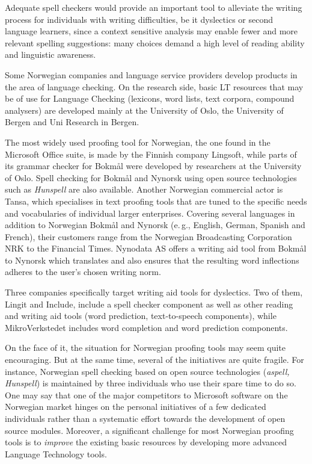 \begin{multicols}{2}

Adequate spell checkers would provide an important tool to alleviate the writing process for individuals with writing difficulties, be it dyslectics or second language learners, since a context sensitive analysis may enable fewer and more relevant spelling suggestions: many choices demand a high level of reading ability and linguistic awareness.

Some Norwegian companies and language service providers develop products in the area of language checking. 
On the research side, basic LT resources that may be of use for Language Checking (lexicons, word lists, text corpora, compound analysers) are developed mainly at the University of Oslo, the University of Bergen and Uni Research in Bergen. 

The most widely used proofing tool for Norwegian, the one found in the Microsoft Office suite, is made by the Finnish company Lingsoft, while parts of its grammar checker for Bokmål were developed by researchers at the University of Oslo. 
Spell checking for Bokmål and Nynorsk using open source technologies such as \textit{Hunspell} are also available.
Another Norwegian commercial actor is Tansa, which specialises in text proofing tools that are tuned to the specific needs and vocabularies of individual larger enterprises. 
Covering several languages in addition to Norwegian Bokmål and Nynorsk
(e.\,g., English, German, Spanish and French), their customers range from the Norwegian Broadcasting Corporation NRK to the Financial Times. 
Nynodata AS offers a writing aid tool from Bokmål to Nynorsk which translates and also ensures that the resulting word inflections adheres to the user’s chosen writing norm.

Three companies specifically target writing aid tools for dyslectics. 
Two of them, Lingit and Include, include a spell checker component as well as other reading and writing aid tools (word prediction, text-to-speech components), while MikroVerkstedet includes word completion and word prediction components.

On the face of it, the situation for Norwegian proofing tools may seem quite encouraging. 
But at the same time, several of the initiatives are quite fragile. 
For instance, Norwegian spell checking based on open source technologies (\textit{aspell, Hunspell}) is maintained by three individuals who use their spare time to do so. 
One may say that one of the major competitors to Microsoft software on the Norwegian market hinges on the personal initiatives of a few dedicated individuals rather than a systematic effort towards the development of open source modules. Moreover, a significant challenge for most Norwegian proofing tools is to \textit{improve} the existing basic resources by developing more advanced Language Technology tools. 


\end{multicols}
